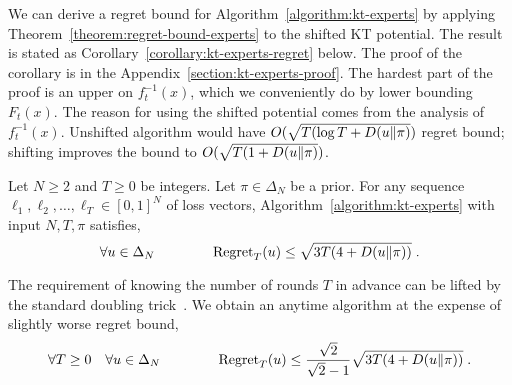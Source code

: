 We can derive a regret bound for Algorithm~\ref{algorithm:kt-experts} by
applying Theorem~\ref{theorem:regret-bound-experts} to the shifted KT potential.
The result is stated as Corollary~\ref{corollary:kt-experts-regret} below. The
proof of the corollary is in the Appendix~\ref{section:kt-experts-proof}. The
hardest part of the proof is an upper on $f_t^{-1}(x)$, which we conveniently do
by lower bounding $F_t(x)$. The reason for using the shifted potential comes
from the analysis of $f_t^{-1}(x)$. Unshifted algorithm would have $O(\sqrt{T
(\log T + D({u}\|{\pi})})$ regret bound; shifting improves the bound to $O(\sqrt{T
(1 + D({u}\|{\pi})})$.

\begin{corollary}
\label{corollary:kt-experts-regret}
Let $N \ge 2$ and $T \ge 0$ be integers. Let $\pi \in \Delta_N$ be a prior.
For any sequence $\ell_1, \ell_2, \dots, \ell_T \in
[0,1]^N$ of loss vectors, Algorithm~\ref{algorithm:kt-experts}
with input $N,T,\pi$ satisfies,
$$
\forall u \in \Delta_N \qquad \qquad \operatorname{Regret}_T(u) \le \sqrt{3T (4 + D({u}\|{\pi}))} \; .
$$
\end{corollary}

The requirement of knowing the number of rounds $T$ in advance can be lifted by
the standard doubling trick~\citep[Section 2.3.1]{Shalev-Shwartz12}. We obtain
an anytime algorithm at the expense of slightly worse regret bound,
$$
\forall T \ge 0 \quad \forall u \in \Delta_N \qquad \qquad
\operatorname{Regret}_T(u) \le \frac{\sqrt{2}}{\sqrt{2} - 1} \sqrt{3T (4 + D({u}\|{\pi}))} \; .
$$
